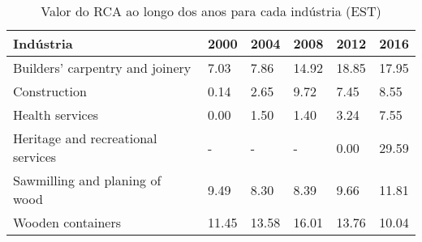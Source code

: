 \begin{table}
\centering
\caption{Valor do RCA ao longo dos anos para cada indústria (EST)}
\label{tab:ex3-tempo-EST}
\begin{tabular}{p{6cm}p{1.5cm}p{1.5cm}p{1.5cm}p{1.5cm}p{1.5cm}}
\toprule
                         Indústria &  2000 &  2004 &  2008 &  2012 &  2016 \\
\midrule
   Builders' carpentry and joinery &  7.03 &  7.86 & 14.92 & 18.85 & 17.95 \\
                      Construction &  0.14 &  2.65 &  9.72 &  7.45 &  8.55 \\
                   Health services &  0.00 &  1.50 &  1.40 &  3.24 &  7.55 \\
Heritage and recreational services &     - &     - &     - &  0.00 & 29.59 \\
    Sawmilling and planing of wood &  9.49 &  8.30 &  8.39 &  9.66 & 11.81 \\
                 Wooden containers & 11.45 & 13.58 & 16.01 & 13.76 & 10.04 \\
\bottomrule
\end{tabular}
\end{table}
